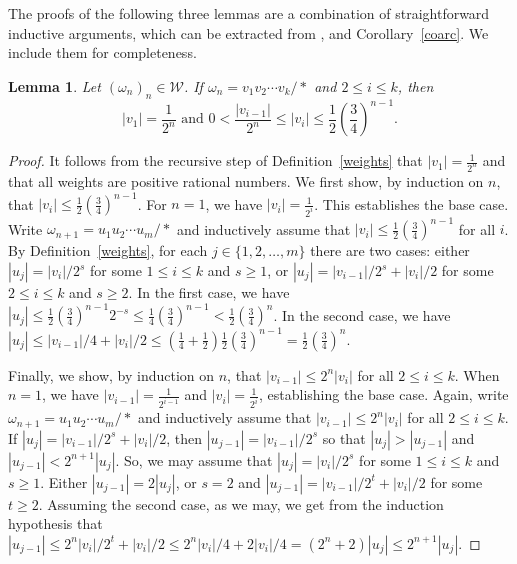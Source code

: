 \documentclass{amsart}
\newtheorem{lemma}[theorem]{Lemma}
\theoremstyle{definition}
\theoremstyle{remark}
\numberwithin{equation}{section}
\begin{document}
The proofs of the following three lemmas are a combination of straightforward inductive arguments, which can be extracted from \cite{MO}, and Corollary~\ref{coarc}. We include them for completeness.

\begin{lemma}\label{one}
Let $(\omega_n)_n\in {\mathcal W}$. If $\omega_n=v_1v_2\cdots v_k/\ast$ and $2\leqslant i\leqslant k$, then \[|v_1|=\frac{1}{2^n}  \mbox{ and } 0<\frac{|v_{i-1}|}{2^n}\leqslant |v_i|\leqslant\frac{1}{2} \left( \frac{3}{4}\right)^{n-1}.\]
\end{lemma}

\begin{proof}
It follows from the recursive step of Definition~\ref{weights} that $|v_1|=\frac{1}{2^n}$ and that all weights are positive rational numbers. We first show, by induction on $n$, that $|v_i|\leqslant\frac{1}{2} \left( \frac{3}{4}\right)^{n-1}$. For $n=1$, we have $|v_i|=\frac{1}{2^i}$. This establishes the base case. Write $\omega_{n+1}=u_1u_2\cdots u_m/\ast$ and inductively assume that $|v_i|\leqslant\frac{1}{2} \left( \frac{3}{4}\right)^{n-1}$ for all $i$. By Definition~\ref{weights}, for each $j\in\{1,2,\ldots,m\}$ there are two cases: either $|u_j|=|v_i|/2^s$ for some $1\leqslant i\leqslant k$ and $s\geqslant 1$, or $|u_j|=|v_{i-1}|/2^s+|v_i|/2$ for some $2\leqslant i \leqslant k$ and $s\geqslant 2$. In the first case, we have $|u_j|\leqslant \frac{1}{2} \left( \frac{3}{4}\right)^{n-1}2^{-s}\leqslant \frac{1}{4} \left( \frac{3}{4}\right)^{n-1}<\frac{1}{2} \left( \frac{3}{4}\right)^{n}$. In the second case, we have $|u_j|\leqslant |v_{i-1}|/4+|v_i|/2\leqslant \left(\frac{1}{4}+\frac{1}{2}\right)\frac{1}{2} \left( \frac{3}{4}\right)^{n-1}= \frac{1}{2} \left( \frac{3}{4}\right)^{n}$.

Finally, we show, by induction on $n$, that $|v_{i-1}|\leqslant 2^n|v_i|$ for all $2\leqslant i \leqslant k$. When $n=1$, we have $|v_{i-1}|=\frac{1}{2^{i-1}}$ and $|v_i|=\frac{1}{2^i}$, establishing the base case. Again, write $\omega_{n+1}=u_1u_2\cdots u_m/\ast$ and inductively assume that $|v_{i-1}|\leqslant 2^n|v_i|$ for all $2\leqslant i \leqslant k$. If $|u_j|=|v_{i-1}|/2^s+|v_i|/2$, then $|u_{j-1}|=|v_{i-1}|/2^s$ so that $|u_j|>|u_{j-1}|$ and $|u_{j-1}|<2^{n+1}|u_j|$. So, we may assume that $|u_j|=|v_i|/2^s$ for some $1\leqslant i\leqslant k$ and $s\geqslant 1$.
Either $|u_{j-1}|=2|u_j|$, or $s=2$ and $|u_{j-1}|=|v_{i-1}|/2^t+|v_i|/2$ for some $t\geqslant 2$. Assuming the second case, as we may, we get from the induction hypothesis that
$|u_{j-1}|\leqslant 2^n|v_i|/2^t+|v_i|/2\leqslant 2^n|v_i|/4+2|v_i|/4=(2^n+2)|u_j|\leqslant 2^{n+1}|u_j|$.
\end{proof}
\end{document}
